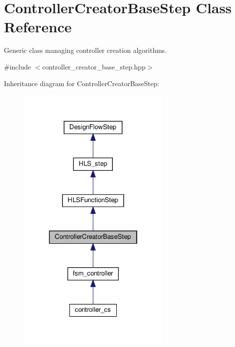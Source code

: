 \hypertarget{classControllerCreatorBaseStep}{}\section{Controller\+Creator\+Base\+Step Class Reference}
\label{classControllerCreatorBaseStep}


Generic class managing controller creation algorithms.  




{\ttfamily \#include $<$controller\+\_\+creator\+\_\+base\+\_\+step.\+hpp$>$}



Inheritance diagram for Controller\+Creator\+Base\+Step\+:
\nopagebreak
\begin{figure}[H]
\begin{center}
\leavevmode
\includegraphics[width=214pt]{d7/d1e/classControllerCreatorBaseStep__inherit__graph}
\end{center}
\end{figure}


